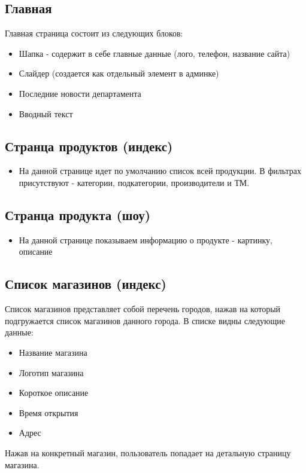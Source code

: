 \documentclass[DIV=calc, paper=a4, fontsize=11pt]{scrartcl} %
\begin{document}
\subsection{Главная}
Главная страница состоит из следующих блоков:
\begin{itemize}
	\item Шапка - содержит в себе главные данные (лого, телефон, название сайта)
	\item Слайдер (создается как отдельный элемент в админке)
	\item Последние новости департамента
	\item Вводный текст
\end{itemize}

\subsection{Странца продуктов (индекс)}
\begin{itemize}
	\item На данной странице идет по умолчанию список всей продукции. В фильтрах присутствуют - категории, подкатегории, производители и ТМ.
\end{itemize}

\subsection{Странца продукта (шоу)}
\begin{itemize}
	\item На данной странице показываем информацию о продукте - картинку, описание
\end{itemize}


\subsection{Список магазинов (индекс)}
Список магазинов представляет собой перечень городов, нажав на который подгружается список магазинов данного города. В списке видны следующие данные:
\begin{itemize}
	\item Название магазина
	\item Логотип магазина
	\item Короткое описание
	\item Время открытия 
	\item Адрес
\end{itemize}

Нажав на конкретный магазин, пользователь попадает на детальную страницу магазина.
\end{document}
